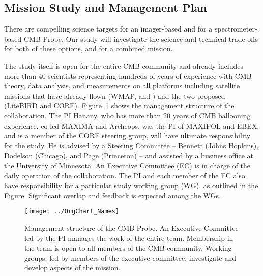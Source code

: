 
\subsection{Mission Study and Management Plan  }
\label{sec:management}

\vspace{-0.05in}


There are compelling science targets for an imager-based and for 
a spectrometer-based CMB Probe. Our study will investigate the science and technical trade-offs 
for both of these options, and for a combined mission. 

The study itself is open for the entire CMB community and already includes more than 40 scientists representing 
hundreds of years of experience with CMB theory, data analysis, and measurements on all platforms including satellite missions
that have already flown (WMAP, and \planck ) and the two proposed (LiteBIRD and CORE). 
Figure~\ref{fig:management} shows the management structure of the collaboration. The PI Hanany, who has more 
than 20 years of CMB ballooning experience, co-led MAXIMA and Archeops, was the PI of MAXIPOL and EBEX, and 
is a member of the CORE steering group, will have ultimate responsibility for the study. He 
is advised by a Steering Committee -- Bennett (Johns Hopkins), Dodelson (Chicago), and Page (Princeton) -- 
and assisted by a business office at the University 
of Minnesota.  An Executive Committee (EC) is in charge of the daily operation of the collaboration. The PI and each member of the 
EC also have responsibility for a particular study working group (WG), as outlined in the Figure. Significant overlap and feedback is 
expected among the WGs. 


\begin{figure}[ht!]
\hspace{-0.1in}
\parbox{3.5in}{\centerline {
\texttt{[image: ../OrgChart\_Names]} } }
\hspace{0.05in}
\parbox{2.5in}{
\caption{ \small \setlength{\baselineskip}{0.95\baselineskip}
Management structure of the CMB Probe. An Executive Committee led by the PI manages the work of the entire team. 
Membership in the team is open to all members of the CMB community. Working groups, led by members of the executive 
committee, investigate and develop aspects of the mission. 
\label{fig:management} } }
\vspace{-0.1in}
\end{figure}



